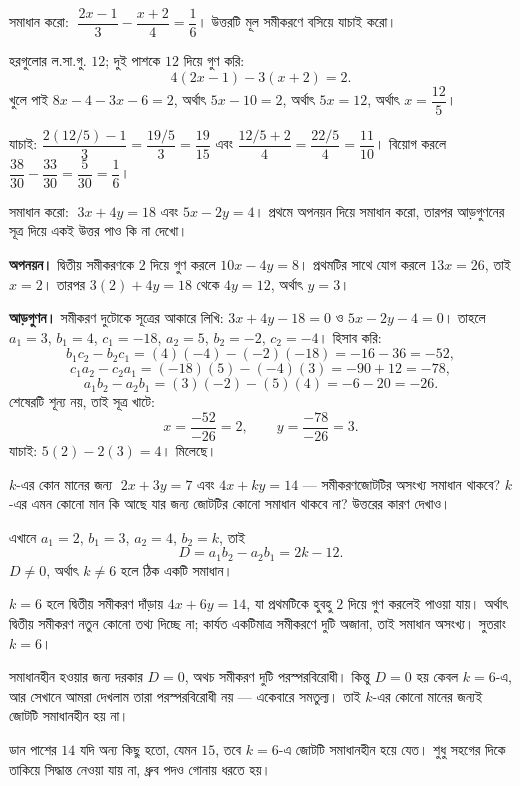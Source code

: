 \documentclass[11pt]{article}
\begin{document}
 সমাধান করো: $\;\dfrac{2x - 1}{3} - \dfrac{x + 2}{4} = \dfrac{1}{6}$।
উত্তরটি মূল সমীকরণে বসিয়ে যাচাই করো।

\begin{sol}
হরগুলোর ল.সা.গু. $12$; দুই পাশকে $12$ দিয়ে গুণ করি:
\[
  4(2x - 1) - 3(x + 2) = 2 .
\]
খুলে পাই $8x - 4 - 3x - 6 = 2$, অর্থাৎ $5x - 10 = 2$, অর্থাৎ $5x = 12$, অর্থাৎ
$x = \dfrac{12}{5}$।

যাচাই: $\dfrac{2(12/5) - 1}{3} = \dfrac{19/5}{3} = \dfrac{19}{15}$ এবং
$\dfrac{12/5 + 2}{4} = \dfrac{22/5}{4} = \dfrac{11}{10}$। বিয়োগ করলে
$\dfrac{38}{30} - \dfrac{33}{30} = \dfrac{5}{30} = \dfrac{1}{6}$।
\end{sol}

 সমাধান করো: $\;3x + 4y = 18$ এবং $5x - 2y = 4$। প্রথমে অপনয়ন দিয়ে
সমাধান করো, তারপর আড়গুণনের সূত্র দিয়ে একই উত্তর পাও কি না দেখো।

\begin{sol}
\textbf{অপনয়ন।} দ্বিতীয় সমীকরণকে $2$ দিয়ে গুণ করলে $10x - 4y = 8$। প্রথমটির
সাথে যোগ করলে $13x = 26$, তাই $x = 2$। তারপর $3(2) + 4y = 18$ থেকে $4y = 12$,
অর্থাৎ $y = 3$।

\medskip
\textbf{আড়গুণন।} সমীকরণ দুটোকে সূত্রের আকারে লিখি:
$3x + 4y - 18 = 0$ ও $5x - 2y - 4 = 0$। তাহলে $a_1 = 3$, $b_1 = 4$, $c_1 = -18$,
$a_2 = 5$, $b_2 = -2$, $c_2 = -4$। হিসাব করি:
\[
  b_1c_2 - b_2c_1 = (4)(-4) - (-2)(-18) = -16 - 36 = -52,
\]
\[
  c_1a_2 - c_2a_1 = (-18)(5) - (-4)(3) = -90 + 12 = -78,
\]
\[
  a_1b_2 - a_2b_1 = (3)(-2) - (5)(4) = -6 - 20 = -26 .
\]
শেষেরটি শূন্য নয়, তাই সূত্র খাটে:
\[
  x = \frac{-52}{-26} = 2, \qquad y = \frac{-78}{-26} = 3 .
\]
যাচাই: $5(2) - 2(3) = 4$। মিলেছে।
\end{sol}

 $k$-এর কোন মানের জন্য $\;2x + 3y = 7$ এবং $4x + ky = 14$ ---
সমীকরণজোটটির অসংখ্য সমাধান থাকবে? $k$-এর এমন কোনো মান কি আছে যার জন্য জোটটির
কোনো সমাধান থাকবে না? উত্তরের কারণ দেখাও।

\begin{sol}
এখানে $a_1 = 2$, $b_1 = 3$, $a_2 = 4$, $b_2 = k$, তাই
\[
  D = a_1b_2 - a_2b_1 = 2k - 12 .
\]
$D \neq 0$, অর্থাৎ $k \neq 6$ হলে ঠিক একটি সমাধান।

$k = 6$ হলে দ্বিতীয় সমীকরণ দাঁড়ায় $4x + 6y = 14$, যা প্রথমটিকে হুবহু $2$ দিয়ে
গুণ করলেই পাওয়া যায়। অর্থাৎ দ্বিতীয় সমীকরণ নতুন কোনো তথ্য দিচ্ছে না; কার্যত
একটিমাত্র সমীকরণে দুটি অজানা, তাই সমাধান অসংখ্য। সুতরাং $k = 6$।

সমাধানহীন হওয়ার জন্য দরকার $D = 0$, অথচ সমীকরণ দুটি পরস্পরবিরোধী। কিন্তু $D = 0$
হয় কেবল $k = 6$-এ, আর সেখানে আমরা দেখলাম তারা পরস্পরবিরোধী নয় --- একেবারে
সমতুল্য। তাই $k$-এর কোনো মানের জন্যই জোটটি সমাধানহীন হয় না।

ডান পাশের $14$ যদি অন্য কিছু হতো, যেমন $15$, তবে $k = 6$-এ জোটটি সমাধানহীন হয়ে
যেত। শুধু সহগের দিকে তাকিয়ে সিদ্ধান্ত নেওয়া যায় না, ধ্রুব পদও গোনায় ধরতে হয়।
\end{sol}
\end{document}
